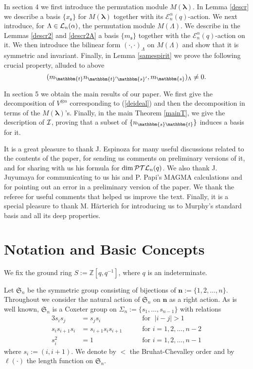 \documentclass[10pt,a4,twoside,hidelinks,rm]{article}
\newcommand\es{\mathbbm{s}}
\newcommand\et{\mathbbm{t}}
\newcommand{\Bs}{\pmb{\mathfrak{s}}}
\newcommand{\Si}{\mathfrak{S}}
\newcommand{\PTL}{{\cal PTL}_n(q)}
\newcommand{\Ea}{ {\mathcal E}_n^{\alpha}(q)}
\newcommand\bS{\Sigma}
\newcommand\blambda{{\boldsymbol\lambda}}
\theoremstyle{plain}
\begin{document}
In section 4 we first introduce
the permutation module $ M(\blambda) $.
In Lemma \ref{descr} we describe a basis $\{ x_{\Bs } \} $ for $ M(\blambda) $ together with
its $ \Ea $-action.  We next introduce, for $ \Lambda \in  {\cal L}_n(\alpha) $, the permutation module
$ M(\Lambda) $. We describe in the Lemmas \ref{descr2} and
\ref{descr2A} 
a basis $\{ m_{\Bs } \} $ together with the
$ \Ea $-action on it. We then introduce the bilinear form $ ( \cdot, \cdot)_{\Lambda} $ on
$ M(\Lambda) $ and show that it is symmetric and invariant. Finally, in Lemma
\ref{samespirit}
we prove the following crucial property, alluded to above
\begin{equation} ( m_{ \et } n_{ \et^{\prime} \es^{\prime}     } , m_{\es})_{\Lambda} \neq 0.
\end{equation}  

In section 5 we obtain the main results of our paper. We first give the decomposition
of $ V^{\otimes n} $ corresponding to (\ref{deideal}) and then the decomposition
in terms of the $ M(\blambda) $'s.
Finally, in the main 
Theorem \ref{mainT}, we give the description of $ \cal I$, proving that
a subset of $ \{ n_{\es \et} \} $ induces a basis for it.


\medskip
It is a great pleasure to thank J. Espinoza for many useful discussions related to the contents of the
paper, for sending us comments on preliminary versions of it, and for sharing with us his
formula for $ \dim \PTL $.
We also
thank J. Juyumaya for communicating to us his and P. Papi's MAGMA calculations
and for pointing out an error in a preliminary version of the paper.
{\color{black}We thank the referee for useful comments that helped us improve the text.}
Finally, it is a special pleasure to 
thank M. H\"arterich for introducing us to Murphy's standard basis
and all its deep properties.

\section{Notation and Basic Concepts}
We fix the ground ring $S:=\mathbb{Z}[q,q^{-1}]$,
where
$q$ is an indeterminate. 




\medskip
Let $\Si_n$ be the symmetric group consisting of bijections of
$ \mathbf{n}:=  \{ 1,2,\ldots, n \} $.
Throughout we consider the natural action of $ \Si_n $ on $ \mathbf{n} $ as a right action.
As is well known, $\Si_n$ is a Coxeter group on $\bS_n:=\{s_1,\ldots, s_{n-1}\} $ with relations
\begin{alignat}{3}
s_is_j&=s_js_i &&\quad\mbox{ for }\; |i-j|>1\label{s1}\\
s_is_{i+1}s_i&=s_{i+1}s_is_{i+1}&&\quad\mbox{ for } i=1,2,\ldots,n-2 \label{ss11}\\
s_i^2&=1&&\quad\mbox{ for } i=1,2,\ldots,n-1\label{sss111}
\end{alignat}
where $ s_i := (i,i+1) $.
We denote by $ < $ the Bruhat-Chevalley order 
and by $\ell(\cdot) $ the length function on $ \Si_n$. 
\end{document}
